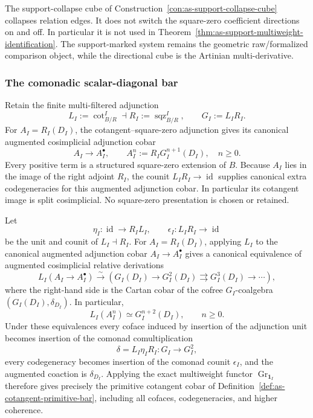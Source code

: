 \begin{remark}
The support-collapse cube of
Construction~\ref{con:as-support-collapse-cube} collapses relation edges.
It does not switch the square-zero coefficient directions on and off.  In
particular it is not used in
Theorem~\ref{thm:as-support-multiweight-identification}.  The support-marked
system remains the geometric raw/formalized comparison object, while the
directional cube is the Artinian multi-derivative.
\end{remark}

\subsubsection*{The comonadic scalar-diagonal bar}

Retain the finite multi-filtered adjunction
\[
    L_I:=\operatorname{cot}^{I}_{B/R}
    \dashv
    R_I:=\operatorname{sqz}^{I}_{B/R},
    \qquad
    G_I:=L_IR_I.
\]
For $A_I=R_I(D_I)$, the cotangent--square-zero adjunction gives its canonical augmented cosimplicial
adjunction cobar
\[
    A_I\longrightarrow A_I^\bullet,
    \qquad
    A_I^n:=R_I G_I^{n+1}(D_I),
    \quad n\geq0.
\]
Every positive term is a structured square-zero extension of $B$.  Because
$A_I$ lies in the image of the right adjoint $R_I$, the counit
$L_IR_I\to\operatorname{id}$ supplies canonical extra codegeneracies for this
augmented adjunction cobar.  In particular its cotangent image is split
cosimplicial.  No square-zero presentation is chosen or retained.

\begin{lemma}
\label{lem:as-adjunction-cobar-cofree}
Let
\[
    \eta_I:\operatorname{id}\longrightarrow R_IL_I,
    \qquad
    \epsilon_I:L_IR_I\longrightarrow\operatorname{id}
\]
be the unit and counit of $L_I\dashv R_I$.  For
$A_I=R_I(D_I)$, applying $L_I$ to the canonical augmented adjunction cobar
$A_I\to A_I^\bullet$ gives a canonical equivalence of augmented
cosimplicial relative derivations
\[
\boxed{
    L_I(A_I\to A_I^\bullet)
    \xrightarrow{\sim}
    \left(
        G_I(D_I)
        \longrightarrow
        G_I^2(D_I)
        \rightrightarrows
        G_I^3(D_I)
        \longrightarrow\cdots
    \right),
}
\]
where the right-hand side is the Cartan cobar of the cofree
$G_I$-coalgebra $(G_I(D_I),\delta_{D_I})$.  In particular,
\[
\boxed{
    L_I(A_I^n)
    \simeq
    G_I^{n+2}(D_I),
    \qquad n\geq0.
}
\]
Under these equivalences every coface induced by insertion of the adjunction
unit becomes insertion of the comonad comultiplication
\[
    \delta=L_I\eta_I R_I:G_I\to G_I^2,
\]
every codegeneracy becomes insertion of the comonad counit $\epsilon_I$, and
the augmented coaction is $\delta_{D_I}$.  Applying the exact multiweight
functor $\operatorname{Gr}_{\mathbf1_I}$ therefore gives precisely the
primitive cotangent cobar of
Definition~\ref{def:as-cotangent-primitive-bar}, including all cofaces,
codegeneracies, and higher coherence.
\end{lemma}

